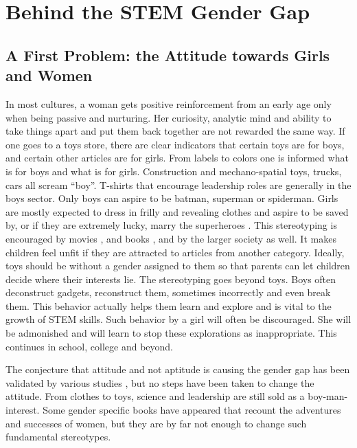 \documentclass[utf8]{frontiersSCNS} %
\begin{document}
\section{Behind the STEM Gender Gap}
\label{causes}
\subsection{A First Problem: the Attitude towards Girls and Women}
\label{Sec2}
 In most cultures, a woman gets positive reinforcement from an early age only when being passive and nurturing. Her curiosity, analytic mind and ability to take things apart and put them back together are not rewarded the same way. If one goes to a toys store, there are clear indicators that certain toys are for boys, and certain other articles are for girls. From labels to colors one is informed what is for boys and what is for girls. Construction and mechano-spatial toys, trucks, cars all scream “boy”. T-shirts that encourage leadership roles are generally in the boys sector. Only boys can aspire to be batman, superman or spiderman. Girls are mostly expected to dress in frilly and revealing clothes and aspire to be saved by, or if they are extremely lucky, marry the superheroes \citep{graff2012too}. This stereotyping is encouraged by movies \citep{bleakley2012trends}, and books \citep{hamilton2006gender}, and by the larger society as well. It makes children feel unfit if they are attracted to articles from another category. Ideally, toys should be without a gender assigned to them so that parents can let children decide where their interests lie. The stereotyping goes beyond toys. Boys often deconstruct gadgets, reconstruct them, sometimes incorrectly and even break them. This behavior actually helps them learn and explore and is vital to the growth of STEM skills. Such behavior by a girl will often be discouraged. She will be admonished and will learn to stop these explorations as inappropriate. This continues in school, college and beyond.
 
The conjecture that attitude and not aptitude is causing the gender gap has been validated by various studies  \citep{penner2015gender, leslie2015expectations}, but no steps have been taken to change the attitude.  From clothes to toys, science and leadership are still sold as a boy-man-interest. Some gender specific books have appeared that recount the adventures and successes of women, but they are by far not enough to change such fundamental stereotypes. 
\end{document}
